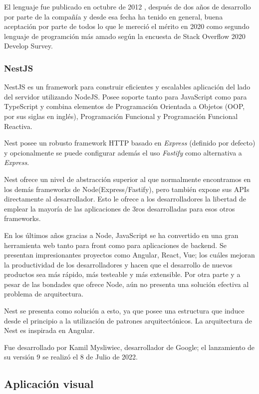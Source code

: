 El lenguaje fue publicado en octubre de 2012 , después de dos años de desarrollo por parte de la compañía y desde esa fecha ha tenido en general, buena aceptación por parte de todos lo que le mereció el mérito en 2020 como segundo lenguaje de programción más amado según la encuesta de Stack Overflow\cite{stack_overflow} 2020 Develop Survey.

\subsubsection{NestJS}\cite{nestjs_doc}
NestJS es un framework para construir eficientes y escalables aplicación del lado del servidor utilizando NodeJS. Posee soporte tanto para JavaScript como para TypeScript y combina elementos de Programación Orientada a Objetos (OOP, por sus siglas en inglés), Programación Funcional y Programación Funcional Reactiva. 

Nest posee un robusto framework HTTP basado en \textit{Express} (definido por defecto) y opcionalmente se puede configurar además el uso \textit{Fastify} como alternativa a \textit{Express}.

Nest ofrece un nivel de abstracción superior al que normalmente encontramos en los demás frameworks de Node(Express/Fastify), pero también expone sus APIs directamente al desarrollador. Esto le ofrece a los desarrolladores la libertad de emplear la mayoría de las aplicaciones de 3ros desarrolladas para esos otros frameworks.

En los últimos años gracias a Node, JavaScript se ha convertido en una gran herramienta web tanto para front como para aplicaciones de backend. Se presentan impresionantes proyectos como Angular, React, Vue; los cuáles mejoran la productividad de los desarrolladores y hacen que el desarrollo de nuevos productos sea más rápido, más testeable y más extensible. Por otra parte y a pesar de las bondades que ofrece Node, aún no presenta una solución efectiva al problema de arquitectura. 

Nest se presenta como solución a esto, ya que posee una estructura que induce desde el principio a la utilización de patrones arquitectónicos. La arquitectura de Nest es inspirada en Angular.

Fue desarrollado por Kamil Mysliwiec, desarrollador de Google; el lanzamiento de su versión 9 se realizó el 8 de Julio de 2022.

\subsection{Aplicación visual}

